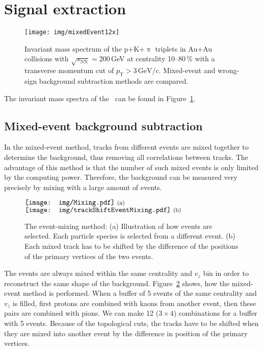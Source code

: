 \section{Signal extraction}

\begin{figure}[htb]
\centering
\texttt{[image: img/mixedEvent12x]}
\caption{\label{fig:invMass}Invariant mass spectrum of the p+K+$\uppi$ triplets in Au+Au collisions with $\sqrt{s_\mathrm{NN}} = 200\,$GeV at centrality 10--80$\,\%$ with a transverse momentum cut of $p_\mathrm{T} > 3\,\text{GeV}/c$. Mixed-event and wrong-sign background subtraction methods are compared.}

\end{figure}

The invariant mass spectra of the \Lambdac\ can be found in Figure~\ref{fig:invMass}\@. 

\subsection{Mixed-event background subtraction}
In the mixed-event method, tracks from different events are mixed together to determine the background, thus removing all correlations between tracks. The advantage of this method is that the number of such mixed events is only limited by the computing power. Therefore, the background can be measured very precisely by mixing with a large amount of events. 

\begin{figure}[htb]
\centering
$
\vcenter{\hbox{\texttt{[image: img/Mixing.pdf]}
\footnotesize{(a)}
}}
$
\hspace*{0.\textwidth}
$
\vcenter{\hbox{\texttt{[image: img/trackShiftEventMixing.pdf]}
\footnotesize{(b)}
}}
$
\caption{\label{fig:mixedIllustrations}The event-mixing method: (a) Illustration of how events are selected. Each particle species is selected from a different event. (b) Each mixed track has to be shifted by the difference of the positions of the primary vertices of the two events.}

\end{figure}

The events are always mixed within the same centrality and $v_z$ bin in order to reconstruct the same shape of the background. Figure~\ref{fig:mixedIllustrations} shows, how the mixed-event method is performed. When a buffer of 5 events of the same centrality and $v_z$ is filled, first protons are combined with kaons from another event, then these pairs are combined with pions. We can make 12 ($3 \times 4$) combinations for a buffer with 5 events. Because of the topological cuts, the tracks have to be shifted when they are mixed into another event by the difference in position of the primary vertices.



